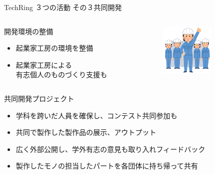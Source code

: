 \documentclass[dvipdfmx]{beamer}
\begin{document}
\begin{frame}{TechRing ３つの活動 その３}{共同開発}
  \begin{columns}
    \begin{column}{0.63\textwidth}
      \begin{block}{開発環境の整備}
        \begin{itemize}
          \item 起業家工房の環境を整備
          \item 起業家工房による\\有志個人のものづくり支援も
        \end{itemize}
      \end{block}
    \end{column}

    \begin{column}{0.28\textwidth}
      \begin{center}
        \includegraphics[width=2.5cm]{pic/Team.png}
      \end{center}
    \end{column}
  \end{columns}

  \begin{alertblock}{共同開発プロジェクト}
    \begin{itemize}
      \item 学科を跨いだ人員を確保し、コンテスト共同参加も
      \item 共同で製作した製作品の展示、アウトプット
      \item 広く外部公開し、学外有志の意見も取り入れフィードバック
      \item 製作したモノの担当したパートを各団体に持ち帰って共有
    \end{itemize}
  \end{alertblock}
\end{frame}
\end{document}
